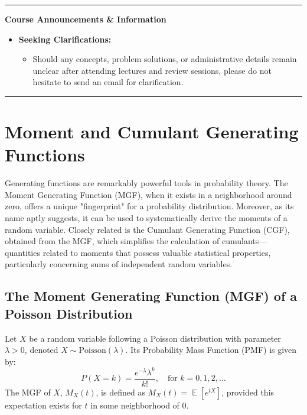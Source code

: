 \documentclass[11pt, letterpaper]{article}
\theoremstyle{plain} %
\theoremstyle{definition} %
\theoremstyle{remark} %
\newenvironment{courseannouncements}
  {\par\bigskip\noindent\begin{center}\rule{\textwidth}{0.4pt}\end{center}\par\nobreak\medskip\noindent\textbf{Course Announcements \& Information}\par\nobreak\medskip\begin{itemize}[leftmargin=*]}
  {\end{itemize}\par\nobreak\medskip\noindent\begin{center}\rule{\textwidth}{0.4pt}\end{center}\par\bigskip}
\DeclareMathOperator{\E}{\mathbb{E}}
\newcommand{\Pois}{\mathrm{Poisson}}
\begin{document}
\begin{courseannouncements}
\begin{itemize}
        \item \textbf{Example of Review Coverage (from a recent session):} One review session might cover certain questions from a problem set (e.g., Q1, Q2), while another session might focus on other questions from the same set (e.g., Q3, Q4, Q5).
        \item \textbf{Sampling and Code Questions:} For questions involving sampling algorithms and code, the review sessions will primarily focus on the theoretical underpinnings of the sampling methods. The specific code implementation details will generally be kept straightforward in the provided solutions.
    \end{itemize}
    \item \textbf{Seeking Clarifications:}
    \begin{itemize}
        \item Should any concepts, problem solutions, or administrative details remain unclear after attending lectures and review sessions, please do not hesitate to send an email for clarification.
    \end{itemize}
\end{courseannouncements}

\section{Moment and Cumulant Generating Functions}
\label{sec:mgf_cgf}

Generating functions are remarkably powerful tools in probability theory. The Moment Generating Function (MGF), when it exists in a neighborhood around zero, offers a unique "fingerprint" for a probability distribution. Moreover, as its name aptly suggests, it can be used to systematically derive the moments of a random variable. Closely related is the Cumulant Generating Function (CGF), obtained from the MGF, which simplifies the calculation of cumulants—quantities related to moments that possess valuable statistical properties, particularly concerning sums of independent random variables.

\subsection{The Moment Generating Function (MGF) of a Poisson Distribution}
\label{subsec:mgf_poisson}

Let $X$ be a random variable following a Poisson distribution with parameter $\lambda > 0$, denoted $X \sim \Pois(\lambda)$. Its Probability Mass Function (PMF) is given by:
\[ P(X=k) = \frac{e^{-\lambda}\lambda^k}{k!}, \quad \text{for } k = 0, 1, 2, \dots \]
The MGF of $X$, $M_X(t)$, is defined as $M_X(t) = \E[e^{tX}]$, provided this expectation exists for $t$ in some neighborhood of 0.
\end{document}
